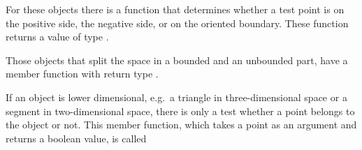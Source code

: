 For these objects there is a function  that
determines whether a test point is on the positive side, the negative
side, or on the oriented boundary. These function returns a value of type
.

Those objects that split the space in a bounded and an unbounded part, have
a member function  with return type
.

If an object is lower dimensional, e.g.\ a triangle in three-dimensional
space or a segment in two-dimensional space, there is only a test whether a
point belongs to the object or not. This member function, which takes a 
point as an argument and returns a boolean value, is called 
